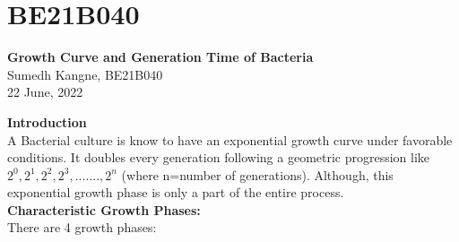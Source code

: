 \section{BE21B040}
\begin{center}
    \textbf{\Large{Growth Curve and Generation Time of Bacteria}} \\
    \normalsize{Sumedh Kangne, BE21B040} \\
    \normalsize{22 June, 2022}
\end{center}

\textbf{\Large{Introduction}} \\

A Bacterial culture is know to have an exponential growth curve under favorable conditions. It doubles every generation following a geometric progression like $2^0,2^1,2^2,2^3,.......,2^n$ (where n=number of generations). Although, this exponential growth phase is only a part of the entire process. \\

\textbf{\Large{Characteristic Growth Phases:}} \\

There are 4 growth phases:

